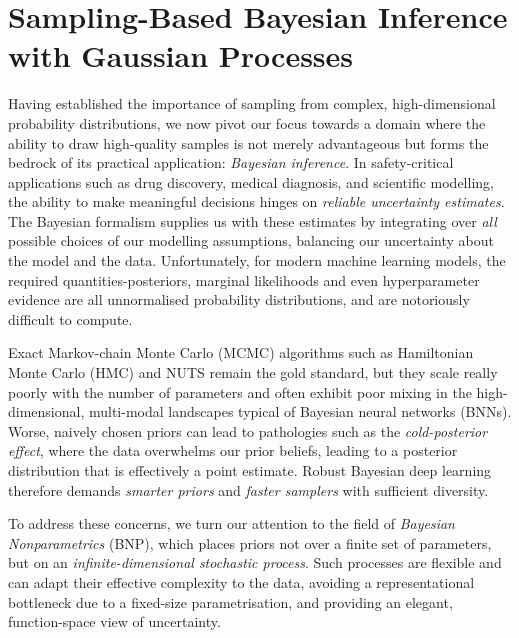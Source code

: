 \chapter[Sampling-Based Bayesian Inference with Gaussian Processes]{Sampling-Based Bayesian Inference with Gaussian Processes}
\label{chapter:gp_sampling}
\ifpdf
    \graphicspath{{Chapter6/Figs/Raster/}{Chapter6/Figs/PDF/}{Chapter6/Figs/}}
\else
    \graphicspath{{Chapter6/Figs/Vector/}{Chapter6/Figs/}}
\fi

Having established the importance of sampling from complex, high-dimensional probability distributions, we now pivot our focus towards a domain where the ability to draw high-quality samples is not merely advantageous but forms the bedrock of its practical application: \textit{Bayesian inference}. In safety-critical applications such as drug discovery, medical diagnosis, and scientific modelling, the ability to make meaningful decisions hinges on \textit{reliable uncertainty estimates}. The Bayesian formalism supplies us with these estimates by integrating over \textit{all} possible choices of our modelling assumptions, balancing our uncertainty about the model and the data. Unfortunately, for modern machine learning models, the required quantities-posteriors, marginal likelihoods and even hyperparameter evidence are all unnormalised probability distributions, and are notoriously difficult to compute. 

Exact Markov-chain Monte Carlo (MCMC) algorithms such as Hamiltonian Monte Carlo (HMC) and NUTS remain the gold standard, but they scale really poorly with the number of parameters and often exhibit poor mixing in the high-dimensional, multi-modal landscapes typical of Bayesian neural networks (BNNs).  Worse, naively chosen priors can lead to pathologies such as the
\emph{cold-posterior effect}, where the data overwhelms our prior beliefs, leading to a posterior distribution that is effectively a point estimate. Robust Bayesian deep learning therefore demands \emph{smarter priors} and \emph{faster samplers} with sufficient diversity.

To address these concerns, we turn our attention to the field of \textit{Bayesian Nonparametrics} (BNP), which places priors not over a finite set of parameters, but on an \textit{infinite-dimensional stochastic process}. Such processes are flexible and can adapt their effective complexity to the data, avoiding a representational bottleneck due to a fixed-size parametrisation, and providing an elegant, function-space view of uncertainty.

